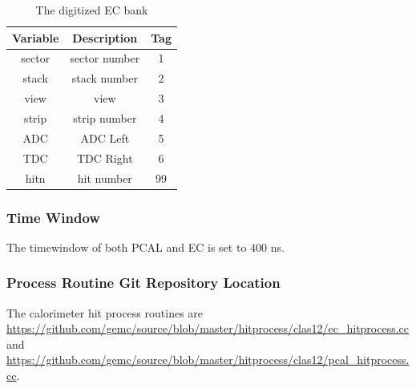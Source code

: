 \begin{table}[h]
	\begin{center}
		\begin{tabular}{| c | c | c |}
			\hline \hline
			Variable         & Description  & Tag  \\
			\hline
             sector  &                                     sector number  &    1 \\
              stack  &                                      stack number  &    2 \\
               view  &                                              view  &    3 \\
              strip  &                                      strip number  &    4 \\
                ADC  &                                          ADC Left  &    5 \\
                TDC  &                                         TDC Right  &    6 \\
               hitn  &                                        hit number  &   99 \\
			\hline \hline
		\end{tabular}
	\end{center}
	\caption{The digitized EC bank}\label{tab:ecBank}
\end{table}


\subsubsection{Time Window}
The timewindow of both PCAL and EC is set to 400 ns.

\subsubsection{Process Routine Git Repository Location}
The calorimeter hit process routines are \url{https://github.com/gemc/source/blob/master/hitprocess/clas12/ec_hitprocess.cc} and
\url{https://github.com/gemc/source/blob/master/hitprocess/clas12/pcal_hitprocess.cc}.

